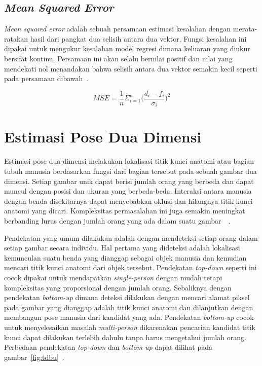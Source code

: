 \subsection{\textit{Mean Squared Error}}
\textit{Mean squared error} adalah sebuah persamaan estimasi kesalahan dengan merata-ratakan
hasil dari pangkat dua selisih antara dua vektor. Fungsi kesalahan ini dipakai untuk mengukur
kesalahan model regresi dimana keluaran yang diukur bersifat kontinu. Persamaan ini akan selalu
bernilai positif dan nilai yang mendekati nol menandakan bahwa selisih antara dua vektor semakin kecil
seperti pada persamaan dibawah~\cite{TORABI201376}.

\begin{equation*}
    MSE = \frac{1}{n}\Sigma_{i=1}^{n}{\Big(\frac{d_i -f_i}{\sigma_i}\Big)^2}
\end{equation*}

\section{Estimasi Pose Dua Dimensi}
\label{sec:2-EstimasiPoseDuaDimensi}

Estimasi pose dua dimensi melakukan lokalisasi titik kunci anatomi atau bagian tubuh manusia
berdasarkan fungsi dari bagian tersebut pada sebuah gambar dua dimensi.
Setiap gambar unik dapat berisi jumlah orang
yang berbeda dan dapat muncul dengan posisi dan ukuran yang berbeda-beda. Interaksi antara manusia
dengan benda disekitarnya dapat menyebabkan oklusi dan hilangnya titik kunci anatomi yang dicari.
Kompleksitas permasalahan ini juga semakin meningkat berbanding lurus dengan jumlah orang yang ada
dalam suatu gambar~\cite{psfor}~\cite{kposolet}.

Pendekatan yang umum dilakukan adalah dengan mendeteksi setiap orang dalam setiap gambar secara
individu. Hal pertama yang dideteksi adalah lokalisasi kemunculan suatu benda yang dianggap sebagai
objek manusia dan kemudian mencari titik kunci anatomi dari objek tersebut.
Pendekatan \textit{top-down} seperti ini cocok dipakai untuk mendapatkan
\textit{single-person} dengan mudah tetapi kompleksitas yang proporsional dengan jumlah orang.
Sebaliknya dengan pendekatan \textit{bottom-up} dimana deteksi dilakukan dengan mencari alamat piksel
pada gambar yang dianggap adalah titik kunci anatomi dan dilanjutkan dengan membangun pose manusia
dari kandidat yang ada. Pendekatan \textit{bottom-up} cocok untuk menyelesaikan masalah
\textit{multi-person} dikarenakan pencarian kandidat titik kunci dapat dilakukan terlebih dahulu tanpa
harus mengetahui jumlah orang. Perbedaan pendekatan \textit{top-down} dan \textit{bottom-up}
dapat dilihat pada gambar~\ref{fig:tdbu}~\cite{8765346}.


